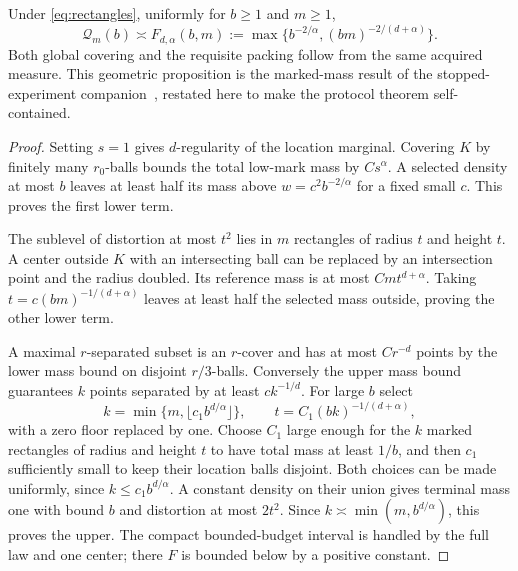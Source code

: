 \begin{proposition}\label{prop:geometry}
Under \eqref{eq:rectangles}, uniformly for $b\ge1$ and $m\ge1$,
\begin{equation}\label{eq:F}
 \mathcal Q_m(b)\asymp F_{d,\alpha}(b,m)
 :=\max\{b^{-2/\alpha},(bm)^{-2/(d+\alpha)}\}.
\end{equation}
Both global covering and the requisite packing follow from the same acquired measure. This geometric proposition is the marked-mass result of the stopped-experiment companion~\cite{GTF52}, restated here to make the protocol theorem self-contained.
\end{proposition}
\begin{proof}
Setting $s=1$ gives $d$-regularity of the location marginal. Covering $K$ by finitely many $r_0$-balls bounds the total low-mark mass by $Cs^\alpha$. A selected density at most $b$ leaves at least half its mass above $w=c^2b^{-2/\alpha}$ for a fixed small $c$. This proves the first lower term.

The sublevel of distortion at most $t^2$ lies in $m$ rectangles of radius $t$ and height $t$. A center outside $K$ with an intersecting ball can be replaced by an intersection point and the radius doubled. Its reference mass is at most $Cmt^{d+\alpha}$. Taking $t=c(bm)^{-1/(d+\alpha)}$ leaves at least half the selected mass outside, proving the other lower term.

A maximal $r$-separated subset is an $r$-cover and has at most $Cr^{-d}$ points by the lower mass bound on disjoint $r/3$-balls. Conversely the upper mass bound guarantees $k$ points separated by at least $ck^{-1/d}$. For large $b$ select
\[
 k=\min\{m,\lfloor c_1 b^{d/\alpha}\rfloor\},\qquad
 t=C_1(bk)^{-1/(d+\alpha)},
\]
with a zero floor replaced by one. Choose $C_1$ large enough for the $k$ marked rectangles of radius and height $t$ to have total mass at least $1/b$, and then $c_1$ sufficiently small to keep their location balls disjoint. Both choices can be made uniformly, since $k\le c_1b^{d/\alpha}$. A constant density on their union gives terminal mass one with bound $b$ and distortion at most $2t^2$. Since $k\asymp\min(m,b^{d/\alpha})$, this proves the upper. The compact bounded-budget interval is handled by the full law and one center; there $F$ is bounded below by a positive constant.
\end{proof}

